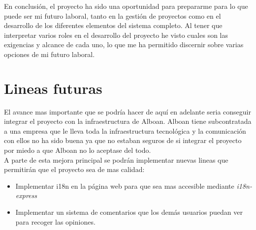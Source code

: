 En conclusión, el proyecto ha sido una oportunidad para prepararme para lo que puede ser mi futuro laboral, tanto en la gestión de proyectos como en el desarrollo de los diferentes elementos del sistema completo. Al tener que interpretar varios roles en el desarrollo del proyecto he visto cuales son las exigencias y alcance de cada uno, lo que me ha permitido discernir sobre varias opciones de mi futuro laboral.

\section{Lineas futuras}
El avance mas importante que se podría hacer de aquí en adelante seria conseguir integrar el proyecto con la infraestructura de Alboan. Alboan tiene subcontratada a una empresa que le lleva toda la infraestructura tecnológica y la comunicación con ellos no ha sido buena ya que no estaban seguros de si integrar el proyecto por miedo a que Alboan no lo aceptase del todo. \\

A parte de esta mejora principal se podrán implementar nuevas lineas que permitirán que el proyecto sea de mas calidad:

\begin{itemize}
	\item Implementar i18n en la página web para que sea mas accesible mediante \textit{i18n-express}
	\item Implementar un sistema de comentarios que los demás usuarios puedan ver para recoger las opiniones.
\end{itemize}
